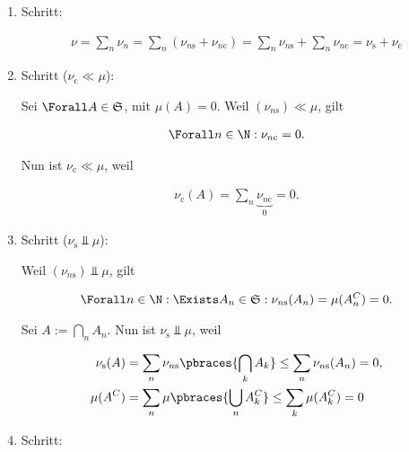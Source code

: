 \begin{solution}

\phantom{}

\begin{enumerate}[label = \arabic*.]

    \item Schritt:
    
    \begin{align*}
        \nu
        =
        \sum_n \nu_n
        =
        \sum_n (\nu_{n \mathrm{s}} + \nu_{n \mathrm c})
        =
        \sum_n \nu_{n \mathrm{s}} + \sum_n \nu_{n \mathrm c}
        =
        \nu_\mathrm{s} + \nu_\mathrm{c}
    \end{align*}
    
    \item Schritt ($\nu_\mathrm{c} \ll \mu$):
    
    Sei $\Forall A \in \mathfrak S$, mit $\mu(A) = 0$.
    Weil $(\nu_{n \mathrm{s}}) \ll \mu$, gilt

    \begin{align*}
        \Forall n \in \N:
            \nu_{n \mathrm c} = 0.
    \end{align*}

    Nun ist $\nu_\mathrm{c} \ll \mu$, weil

    \begin{align*}
        \nu_\mathrm{c}(A) = \sum_n \underbrace{\nu_{n \mathrm c}}_0 = 0.
    \end{align*}

    \item Schritt ($\nu_\mathrm{s} \Bot \mu$):
    
    Weil $(\nu_{n \mathrm{s}}) \Bot \mu$, gilt
    
    \begin{align*}
        \Forall n \in \N:
            \Exists A_n \in \mathfrak S:
                \nu_{n \mathrm{s}}(A_n) = \mu(A_n^C) = 0.
    \end{align*}

    Sei $A := \bigcap_n A_n$.
    Nun ist $\nu_\mathrm{s} \Bot \mu$, weil

    \begin{align*}
        \nu_\mathrm{s}(A) & = \sum_n \nu_{n \mathrm{s}} \pbraces{\bigcap_k A_k} \leq \sum_n \nu_{n \mathrm{s}}(A_n) = 0, \\
        \mu(A^C) & = \sum_n \mu \pbraces{\bigcup_n A_k^C} \leq \sum_k \mu(A_k^C) = 0
    \end{align*}

    \item Schritt:
    

\end{enumerate}
\end{solution}

